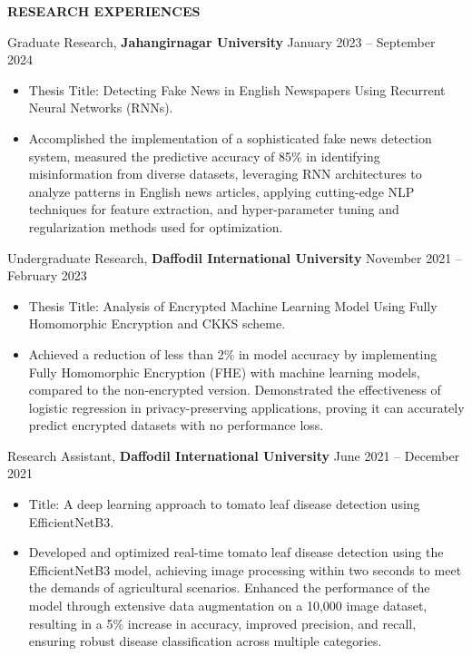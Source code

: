 \documentclass[a4paper, 12pt]{article}
\begin{document}
\begin{flushleft}
	\noindent
	\textbf{RESEARCH EXPERIENCES}\hrulefill
\end{flushleft}
\vspace{-12pt}

Graduate Research, \textbf{Jahangirnagar University} \hfill January 2023 -- September 2024 
\begin{itemize}[noitemsep, topsep=0pt, partopsep=0pt, parsep=0pt]
	\item Thesis Title: Detecting Fake News in English Newspapers Using Recurrent Neural Networks (RNNs).
    \item Accomplished the implementation of a sophisticated fake news detection system, measured the predictive accuracy of 85\% in identifying misinformation from diverse datasets, leveraging RNN architectures to analyze patterns in English news articles, applying cutting-edge NLP techniques for feature extraction, and hyper-parameter tuning and regularization methods used for optimization.
\end{itemize}
\vspace{12pt}

Undergraduate Research, \textbf{Daffodil International University} \hfill November 2021 -- February 2023
\begin{itemize}[noitemsep, topsep=0pt, partopsep=0pt, parsep=0pt]
	\item Thesis Title: Analysis of Encrypted Machine Learning Model Using Fully Homomorphic Encryption and CKKS scheme.
    \item Achieved a reduction of less than 2\% in model accuracy by implementing Fully Homomorphic Encryption (FHE) with machine learning models, compared to the non-encrypted version. Demonstrated the effectiveness of logistic regression in privacy-preserving applications, proving it can accurately predict encrypted datasets with no performance loss.
\end{itemize} 
\vspace{12pt}

Research Assistant, \textbf{Daffodil International University} \hfill June 2021 -- December 2021
\begin{itemize}[noitemsep, topsep=0pt, partopsep=0pt, parsep=0pt]
	\item Title: A deep learning approach to tomato leaf disease detection using EfficientNetB3.
    \item Developed and optimized real-time tomato leaf disease detection using the EfficientNetB3 model, achieving image processing within two seconds to meet the demands of agricultural scenarios. Enhanced the performance of the model through extensive data augmentation on a 10,000 image dataset, resulting in a 5\% increase in accuracy, improved precision, and recall, ensuring robust disease classification across multiple categories.
\end{itemize}
\end{document}
